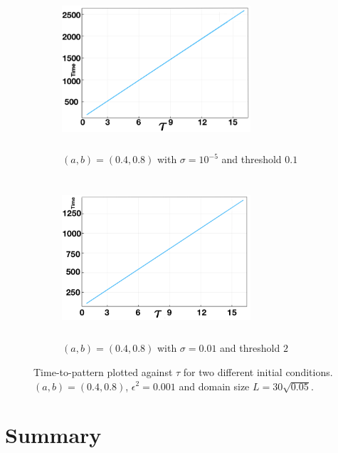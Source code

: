 \begin{figure}[H]
    \centering
    \begin{subfigure}[b]{0.45\textwidth}
        \centering
        \includegraphics[width=7cm,height=6cm]{longlin3.png}
        \caption{$(a,b)=(0.4,0.8)$ with $\sigma=10^{-5}$ and threshold $0.1$}
        \label{fig:linperturb2a}
    \end{subfigure}
    \hfill
    \begin{subfigure}[b]{0.45\textwidth}
        \centering
        \includegraphics[width=7cm,height=6cm]{longlin4.png}
        \caption{$(a,b)=(0.4,0.8)$ with $\sigma=0.01$ and threshold $2$}
        \label{fig:linperturb2b}
    \end{subfigure}
    \caption{Time-to-pattern plotted against $\tau$ for two different initial conditions. $(a,b)=(0.4,0.8)$, $\epsilon^2=0.001$ and domain size $L=30\sqrt{0.05}$.}
    \label{}
\end{figure}


\section{Summary}

